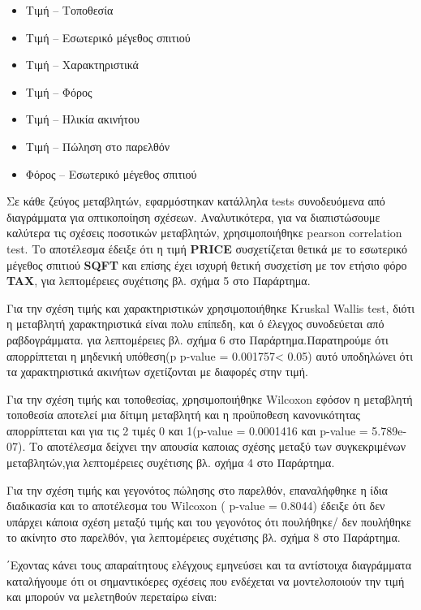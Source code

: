 \documentclass[
  10pt,
]{article}
\begin{document}
\begin{itemize}
  \item Τιμή -- Τοποθεσία
  \item Τιμή -- Εσωτερικό μέγεθος σπιτιού
  \item Τιμή -- Χαρακτηριστικά
  \item Τιμή -- Φόρος
  \item Τιμή -- Ηλικία ακινήτου
  \item Τιμή -- Πώληση στο παρελθόν
  \item Φόρος -- Εσωτερικό μέγεθος σπιτιού
\end{itemize}

Σε κάθε ζεύγος μεταβλητών, εφαρμόστηκαν κατάλληλα tests συνοδευόμενα από
διαγράμματα για οπτικοποίηση σχέσεων. Αναλυτικότερα, για να
διαπιστώσουμε καλύτερα τις σχέσεις ποσοτικών μεταβλητών, χρησιμοποιήθηκε
pearson correlation test. Το αποτέλεσμα έδειξε ότι η τιμή \textbf{PRICE}
συσχετίζεται θετικά με το εσωτερικό μέγεθος σπιτιού \textbf{SQFT} και
επίσης έχει ισχυρή θετική συσχετίση με τον ετήσιο φόρο \textbf{TAX}, για
λεπτομέρειες συχέτισης βλ. σχήμα 5 στο Παράρτημα.

Για την σχέση τιμής και χαρακτηριστικών χρησιμοποιήθηκε Kruskal Wallis
test, διότι η μεταβλητή χαρακτηριστικά είναι πολυ επίπεδη, και ό έλεγχος
συνοδεύεται από ραβδογράμματα. για λεπτομέρειες βλ. σχήμα 6 στο
Παράρτημα.Παρατηρούμε ότι απορρίπτεται η μηδενική υπόθεση(p p-value =
0.001757\textless{} 0.05) αυτό υποδηλώνει ότι τα χαρακτηριστικά ακινήτων
σχετίζονται με διαφορές στην τιμή.

Για την σχέση τιμής και τοποθεσίας, χρησιμοποιήθηκε Wilcoxon εφόσον η
μεταβλητή τοποθεσία αποτελεί μια δίτιμη μεταβλητή και η προϋποθεση
κανονικότητας απορρίπτεται και για τις 2 τιμές 0 και 1(p-value =
0.0001416 και p-value = 5.789e-07). Το αποτέλεσμα δείχνει την απουσία
καποιας σχέσης μεταξύ των συγκεκριμένων μεταβλητών,για λεπτομέρειες
συχέτισης βλ. σχήμα 4 στο Παράρτημα.

Για την σχέση τιμής και γεγονότος πώλησης στο παρελθόν, επαναλήφθηκε η
ίδια διαδικασία και το αποτέλεσμα του Wilcoxon ( p-value = 0.8044)
έδειξε ότι δεν υπάρχει κάποια σχέση μεταξύ τιμής και του γεγονότος ότι
πουλήθηκε/ δεν πουλήθηκε το ακίνητο στο παρελθόν, για λεπτομέρειες
συχέτισης βλ. σχήμα 8 στο Παράρτημα.

΄Εχοντας κάνει τους απαραίτητους ελέγχους εμηνεύσει και τα αντίστοιχα
διαγράμματα καταλήγουμε ότι οι σημαντικόερες σχέσεις που ενδέχεται να
μοντελοποιούν την τιμή και μπορούν να μελετηθούν περεταίρω είναι:
\end{document}
